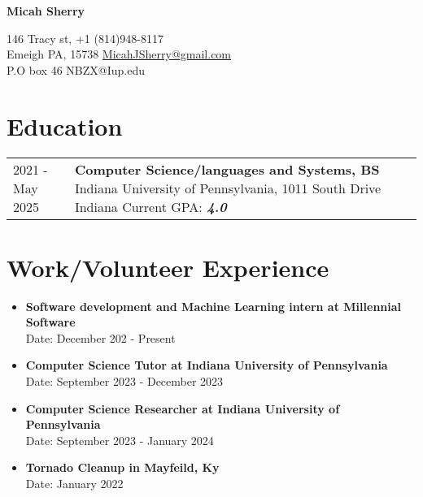 \documentclass[12pt]{article}
\begin{document}
\begin{center}
     \Huge{\textbf{Micah Sherry}}
\end{center}
146 Tracy st, \hfill +1 (814)948-8117\\
Emeigh PA, 15738 \hfill \href{mailto:MicahJSherry@gmail.com}{MicahJSherry@gmail.com} \\ 
P.O box 46 \hfill {NBZX@Iup.edu}



\section{Education}
\begin{tabular}{ l p{15in} }
    2021 - May 2025 & \textbf{Computer Science/languages and Systems, BS} \newline Indiana University of Pennsylvania, 1011 South Drive Indiana 
    \newline Current GPA: \textbf{\textit{4.0}} \\
     
\end{tabular}


\section{Work/Volunteer Experience}
\begin{itemize}
    \itemsep=-0em
    \item \textbf{Software development and Machine Learning intern at Millennial Software} \\ 
Date: December 202 - Present
    \item \textbf{Computer Science Tutor at Indiana University of Pennsylvania} \\ 
Date: September 2023 - December 2023 
    \item \textbf{Computer Science Researcher at Indiana University of Pennsylvania} \\ 
Date: September 2023 - January 2024 
    \item \textbf{Tornado Cleanup in Mayfeild, Ky} \\ 
Date: January 2022
 

\end{itemize}
\end{document}
